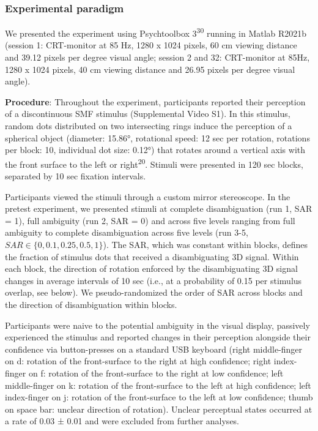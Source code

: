 \documentclass[
]{article}
\begin{document}
\hypertarget{experimental-paradigm}{%
\subsubsection{Experimental paradigm}\label{experimental-paradigm}}

We presented the experiment using Psychtoolbox 3\textsuperscript{30}
running in Matlab R2021b (session 1: CRT-monitor at 85 Hz, 1280 x 1024
pixels, 60 cm viewing distance and 39.12 pixels per degree visual angle;
session 2 and 32: CRT-monitor at 85Hz, 1280 x 1024 pixels, 40 cm viewing
distance and 26.95 pixels per degree visual angle).

\textbf{Procedure}: Throughout the experiment, participants reported
their perception of a discontinuous SMF stimulus (Supplemental Video
S1). In this stimulus, random dots distributed on two intersecting rings
induce the perception of a spherical object (diameter: 15.86°,
rotational speed: 12 sec per rotation, rotations per block: 10,
individual dot size: 0.12°) that rotates around a vertical axis with the
front surface to the left or right\textsuperscript{20}. Stimuli were
presented in 120 sec blocks, separated by 10 sec fixation intervals.

Participants viewed the stimuli through a custom mirror stereoscope. In
the pretest experiment, we presented stimuli at complete disambiguation
(run 1, SAR = 1), full ambiguity (run 2, SAR = 0) and across five levels
ranging from full ambiguity to complete disambiguation across five
levels (run 3-5, \(SAR \in \{0, 0.1, 0.25, 0.5, 1\}\)). The SAR, which
was constant within blocks, defines the fraction of stimulus dots that
received a disambiguating 3D signal. Within each block, the direction of
rotation enforced by the disambiguating 3D signal changes in average
intervals of 10 sec (i.e., at a probability of 0.15 per stimulus
overlap, see below). We pseudo-randomized the order of SAR across blocks
and the direction of disambiguation within blocks.

Participants were naive to the potential ambiguity in the visual
display, passively experienced the stimulus and reported changes in
their perception alongside their confidence via button-presses on a
standard USB keyboard (right middle-finger on d: rotation of the
front-surface to the right at high confidence; right index-finger on f:
rotation of the front-surface to the right at low confidence; left
middle-finger on k: rotation of the front-surface to the left at high
confidence; left index-finger on j: rotation of the front-surface to the
left at low confidence; thumb on space bar: unclear direction of
rotation). Unclear perceptual states occurred at a rate of 0.03 ± 0.01
and were excluded from further analyses.
\end{document}
